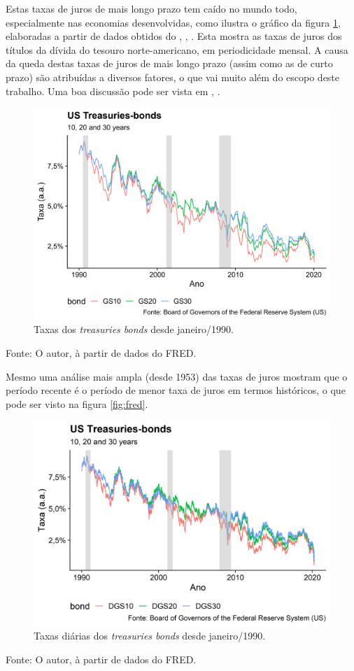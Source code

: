 \documentclass[
	12pt,				%
	oneside,			%
	a4paper,			%
	chapter=TITLE,		%
	section=TITLE,		%
	english,			%
	brazil				%
	]{abntex2}
\newcommand{\bcenter}{\begin{center}}
\newcommand{\ecenter}{\end{center}}
\begin{document}
Estas taxas de juros de mais longo prazo tem caído no mundo todo,
especialmente nas economias desenvolvidas, como ilustra o gráfico da
figura \ref{fig:yields}, elaboradas a partir de dados obtidos do
\textcite{fredgs10}, \textcite{fredgs20}, \textcite{fredgs30}. Esta
mostra as taxas de juros dos títulos da dívida do tesouro
norte-americano, em periodicidade mensal. A causa da queda destas taxas
de juros de mais longo prazo (assim como as de curto prazo) são
atribuídas a diversos fatores, o que vai muito além do escopo deste
trabalho. Uma boa discussão pode ser vista em \textcite{bresser2018},
\textcite{krugman2020}.
\begin{figure}[H]

{\centering \includegraphics[width=0.7\linewidth]{images/yields-1} 

}

\caption{Taxas dos \emph{treasuries bonds} desde janeiro/1990.}\label{fig:yields}
\end{figure}
\bcenter
Fonte: O autor, à partir de dados do \gls{FRED}. \ecenter

Mesmo uma análise mais ampla (desde 1953) das taxas de juros mostram que
o período recente é o período de menor taxa de juros em termos
históricos, o que pode ser visto na figura \ref{fig:fred}.
\begin{figure}[H]

{\centering \includegraphics[width=0.7\linewidth]{images/yields2-1} 

}

\caption{Taxas diárias dos \emph{treasuries bonds} desde janeiro/1990.}\label{fig:yields2}
\end{figure}
\bcenter
Fonte: O autor, à partir de dados do \gls{FRED}. \ecenter
\end{document}
